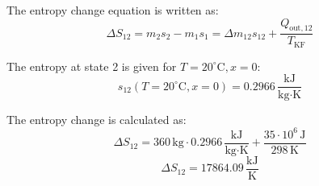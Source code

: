 The entropy change equation is written as:  
\[
\Delta S_{12} = m_2 s_2 - m_1 s_1 = \Delta m_{12} s_{12} + \frac{Q_{\text{out},12}}{T_{\text{KF}}}
\]  

The entropy at state 2 is given for \( T = 20^\circ\text{C}, x = 0 \):  
\[
s_{12} (T = 20^\circ\text{C}, x = 0) = 0.2966 \, \frac{\text{kJ}}{\text{kg·K}}
\]  

The entropy change is calculated as:  
\[
\Delta S_{12} = 360 \, \text{kg} \cdot 0.2966 \, \frac{\text{kJ}}{\text{kg·K}} + \frac{35 \cdot 10^6 \, \text{J}}{298 \, \text{K}}
\]  
\[
\Delta S_{12} = 17864.09 \, \frac{\text{kJ}}{\text{K}}
\]